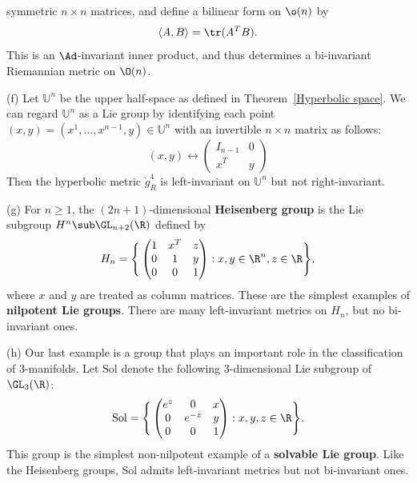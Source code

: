 \begin{example}
symmetric $n\times n$ matrices, and define a bilinear form on $\o(n)$ by
\[\langle A,B\rangle=\tr(A^TB).\]
This is an $\Ad$-invariant inner product, and thus determines a bi-invariant Riemannian metric 
on $\O(n)$.
\item[(f)] Let $\mathbb{U}^n$ be the upper half-space as defined in Theorem~\ref{Hyperbolic space}. 
We can regard $\mathbb{U}^n$ as a Lie group by identifying each point $(x,y)=(x^1,\dots,x^{n-1},y)\in\mathbb{U}^n$ 
with an invertible $n\times n$ matrix as follows:
\[(x,y)\longleftrightarrow\begin{pmatrix}
I_{n-1}&0\\
x^T&y
\end{pmatrix}\]
Then the hyperbolic metric $\breve{g}^4_R$ is left-invariant on $\mathbb{U}^n$ but not 
right-invariant.
\item[(g)] For $n\geq 1$, the $(2n+1)$-dimensional \textbf{Heisenberg group} is the Lie subgroup $H^n\sub\GL_{n+2}(\R)$ 
defined by
\[H_n=\Bigg\{\begin{pmatrix}
1&x^T&z\\
0&1&y\\
0&0&1
\end{pmatrix}:x,y\in\R^n,z\in\R\Bigg\},\]
where $x$ and $y$ are treated as column matrices. These are the simplest examples of \textbf{nilpotent 
Lie groups}. There are many left-invariant metrics on $H_n$, but no bi-invariant ones.
\item[(h)] Our last example is a group that plays an important role in the classification of $3$-manifolds. Let $\mathrm{Sol}$ denote the following $3$-dimensional 
Lie subgroup of $\GL_3(\R)$:
\[\mathrm{Sol}=\Bigg\{\begin{pmatrix}
e^z&0&x\\
0&e^{-z}&y\\
0&0&1
\end{pmatrix}:x,y,z\in\R\Bigg\}.\]
This group is the simplest non-nilpotent example of a \textbf{solvable Lie group}. Like the 
Heisenberg groups, Sol admits left-invariant metrics but not bi-invariant ones.
\end{example}
